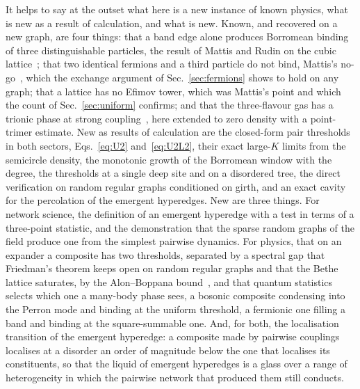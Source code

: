 \documentclass[aps,pre,twocolumn,superscriptaddress,floatfix]{revtex4-2}
\begin{document}
It helps to say at the outset what here is a new instance of known
physics, what is new as a result of calculation, and what is new. Known,
and recovered on a new graph, are four things: that a band edge alone
produces Borromean binding of three distinguishable particles, the result
of Mattis and Rudin on the cubic lattice~\cite{mattis1984}; that two
identical fermions and a third particle do not bind, Mattis's
no-go~\cite{mattis1986}, which the exchange argument of
Sec.~\ref{sec:fermions} shows to hold on any graph; that a lattice has no
Efimov tower, which was Mattis's point and which the count of Sec.~\ref{sec:uniform} confirms; and that the three-flavour gas has a
trionic phase at strong coupling~\cite{rapp2007,inaba2011}, here extended
to zero density with a point-trimer estimate. New as results of
calculation are the closed-form pair thresholds in both sectors,
Eqs.~\eqref{eq:U2} and~\eqref{eq:U2L2}, their exact large-$K$ limits from
the semicircle density, the monotonic growth of the Borromean window with
the degree, the thresholds at a single deep site and on a disordered
tree, the direct verification on random regular graphs conditioned on
girth, and an exact cavity for the percolation of the emergent
hyperedges. New are three things. For network science, the definition of
an emergent hyperedge with a test in terms of a three-point statistic,
and the demonstration that the sparse random graphs of the field produce
one from the simplest pairwise dynamics. For physics, that on an expander
a composite has two thresholds, separated by a spectral gap that Friedman's theorem keeps open on random
regular graphs and that the Bethe lattice saturates, by the Alon--Boppana
bound~\cite{friedman2008,alon1986,nilli1991}, and that
quantum statistics selects which one a many-body phase sees, a bosonic
composite condensing into the Perron mode and binding at the uniform
threshold, a fermionic one filling a band and binding at the
square-summable one. And, for both, the localisation transition of the
emergent hyperedge: a composite made by pairwise couplings localises at a
disorder an order of magnitude below the one that localises its
constituents, so that the liquid of emergent hyperedges is a glass over a
range of heterogeneity in which the pairwise network that produced them
still conducts.
\end{document}
